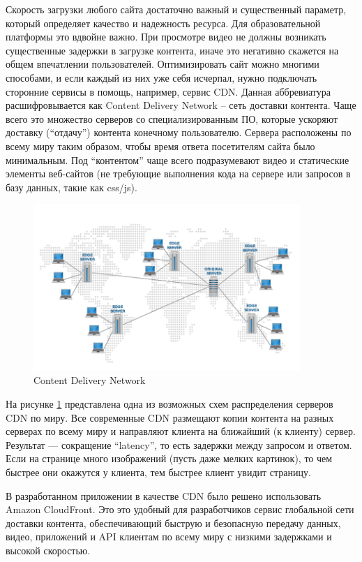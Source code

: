 Скорость загрузки любого сайта достаточно важный и существенный параметр, который определяет
качество и надежность ресурса. Для образовательной платформы это вдвойне важно. При просмотре
видео не должны возникать существенные задержки в загрузке контента, иначе это негативно
скажется на общем впечатлении пользователей. Оптимизировать сайт можно многими способами,
и если каждый из них уже себя исчерпал, нужно подключать сторонние сервисы в помощь, например,
сервис CDN. Данная аббревиатура расшифровывается как Content Delivery Network – сеть доставки
контента. Чаще всего это множество серверов со специализированным ПО, которые ускоряют доставку
(“отдачу”) контента конечному пользователю. Сервера расположены по всему миру таким образом,
чтобы время ответа посетителям сайта было минимальным. Под “контентом” чаще всего
подразумевают видео и статические элементы веб-сайтов (не требующие выполнения кода на сервере
или запросов в базу данных, такие как css/js).

\begin{figure}
  \centering
  \includegraphics[width=0.9\textwidth]{images/how-cdn-works.png}
  \caption{Content Delivery Network\label{how-cdn-works}}
\end{figure}

На рисунке \ref{how-cdn-works} представлена одна из возможных схем распределения серверов CDN по миру.
Все современные CDN размещают копии контента на разных серверах по всему миру и направляют
клиента на ближайший (к клиенту) сервер. Результат — сокращение “latency”, то есть задержки
между запросом и ответом. Если на странице много изображений (пусть даже мелких картинок),
то чем быстрее они окажутся у клиента, тем быстрее клиент увидит страницу.

В разработанном приложении в качестве CDN было решено использовать Amazon CloudFront.
Это это удобный для разработчиков сервис глобальной сети доставки контента, обеспечивающий
быструю и безопасную передачу данных, видео, приложений и API клиентам по всему миру
с низкими задержками и высокой скоростью.


